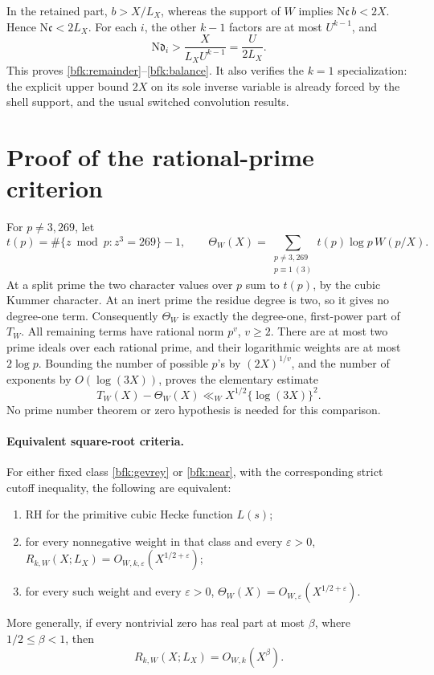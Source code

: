 In the retained part, \(b>X/L_X\), whereas the support of \(W\)
implies \(\mathrm N\mathfrak c\,b<2X\).  Hence
\(\mathrm N\mathfrak c<2L_X\).
For each \(i\), the other \(k-1\) factors are at most \(U^{k-1}\),
and
\[
 \mathrm N\mathfrak d_i>
       \frac{X}{L_XU^{k-1}}=\frac{U}{2L_X}.
\]
This proves \eqref{bfk:remainder}--\eqref{bfk:balance}.
It also verifies the \(k=1\) specialization: the explicit upper
bound \(2X\) on its sole inverse variable is already forced by
the shell support, and the usual switched convolution results.

\section{Proof of the rational-prime criterion}

For \(p\ne3,269\), let
\[
 t(p)=\#\{z\bmod p:z^3=269\}-1,\qquad
 \Theta_W(X)=
 \sum_{\substack{p\ne3,269\\p\equiv1\ (3)}}
       t(p)\log p\,W(p/X).
\]
At a split prime the two character values over \(p\) sum to
\(t(p)\), by the cubic Kummer character.  At an inert prime the
residue degree is two, so it gives no degree-one term.
Consequently \(\Theta_W\) is exactly the degree-one,
first-power part of \(T_W\).
All remaining terms have rational norm \(p^v\), \(v\ge2\).
There are at most two prime ideals over each rational prime,
and their logarithmic weights are at most \(2\log p\).
Bounding the number of possible \(p\)'s by
\((2X)^{1/v}\), and the number of exponents by \(O(\log(3X))\),
proves the elementary estimate
\begin{equation}
 T_W(X)-\Theta_W(X)
      \ll_W X^{1/2}\{\log(3X)\}^2.
 \label{bfk:prime-powers}
\end{equation}
No prime number theorem or zero hypothesis is needed for this
comparison.

\paragraph{Equivalent square-root criteria.}
For either fixed class \eqref{bfk:gevrey} or \eqref{bfk:near},
with the corresponding strict cutoff inequality, the following
are equivalent:
\begin{enumerate}
\item RH for the primitive cubic Hecke function \(L(s)\);
\item for every nonnegative weight in that class and every
      \(\varepsilon>0\),
      \(R_{k,W}(X;L_X)=O_{W,k,\varepsilon}(X^{1/2+\varepsilon})\);
\item for every such weight and every \(\varepsilon>0\),
      \(\Theta_W(X)=O_{W,\varepsilon}(X^{1/2+\varepsilon})\).
\end{enumerate}
More generally, if every nontrivial zero has real part at most
\(\beta\), where \(1/2\le\beta<1\), then
\begin{equation}
 R_{k,W}(X;L_X)=O_{W,k}(X^\beta).
 \label{bfk:zero-bound}
\end{equation}

